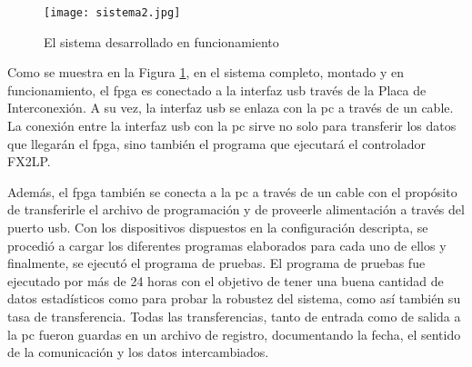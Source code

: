 \begin{figure}[ht]
	\centering
	\texttt{[image: sistema2.jpg]}
	\caption{El sistema desarrollado en funcionamiento}
	\label{test:todo}
\end{figure}

Como se muestra en la Figura \ref{test:todo}, en el sistema completo, montado y en funcionamiento, el \acrshort{fpga} es conectado a la interfaz \acrshort{usb} través de la Placa de Interconexión. A su vez, la interfaz \acrshort{usb} se enlaza con la \acrshort{pc} a través de un cable. La conexión entre la interfaz \acrshort{usb} con la \acrshort{pc} sirve no solo para transferir los datos que llegarán el \acrshort{fpga}, sino también el programa que ejecutará el controlador FX2LP.

Además, el \acrshort{fpga} también se conecta a la \acrshort{pc} a través de un cable con el propósito de transferirle el archivo de programación y de proveerle alimentación a través del puerto \acrshort{usb}.
Con los dispositivos dispuestos en la configuración descripta, se procedió a cargar los diferentes programas elaborados para cada uno de ellos y finalmente, se ejecutó el programa de pruebas.
El programa de pruebas fue ejecutado por más de 24 horas con el objetivo de tener una buena cantidad de datos estadísticos como para probar la robustez del sistema, como así también su tasa de transferencia.
Todas las transferencias, tanto de entrada como de salida a la \acrshort{pc} fueron guardas en un archivo de registro, documentando la fecha, el sentido de la comunicación y los datos intercambiados. 